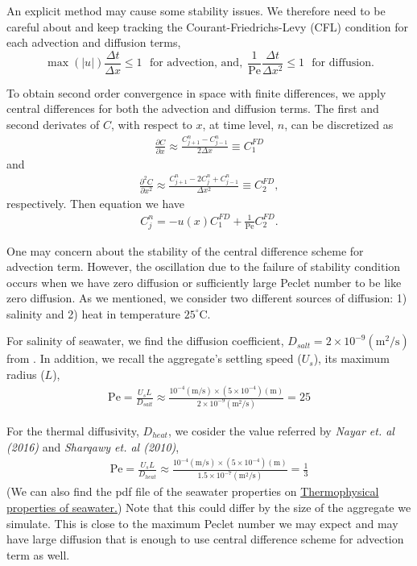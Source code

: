 An explicit method may cause some stability issues. We therefore need to be careful about and keep tracking the Courant-Friedrichs-Levy (CFL) condition for each advection and diffusion terms,
\begin{equation}
	\max(|u|) \frac{\Delta t}{\Delta x}  \leq 1 \ \ \ \text{for advection, and,}
	\ \  \frac{1}{\text{Pe}}\frac{\Delta t}{\Delta x^2}  \leq 1 \ \ \ \text{for diffusion}.
	\end{equation}
\par
To obtain second order convergence in space with finite differences, we apply  central differences for both the advection and diffusion terms. The first and second derivates of $C$, with respect to $x$, at time level, $n$, can be discretized as
\begin{align}
	\frac{\partial C}{\partial x}  \approx
	 \frac{C_{j+1}^{n} - C_{ j-1}^{n}}{2 \Delta x}
	 \equiv C_1^{FD}
	 \label{eq_c1_fd}
\end{align}
and
\begin{align}
	 \frac{\partial^2 C}{\partial x^2} \approx
	 \frac{C_{ j+1}^n -2 C_{j}^n + C_{ j-1}^n}{\Delta x^2}
	  \equiv C_2^{FD},
	 \label{eq_c2_fd}
\end{align}
respectively. 
Then equation we have
\begin{align}
	 C_{j}^n
	=  -u(x) C_1^{FD} + \frac{1}{\text{Pe}} C_2^{FD}.
\end{align}
\par
One may concern about the stability of the central difference scheme for advection term. However, the oscillation due to the failure of stability condition occurs when we have zero diffusion or sufficiently large Peclet number to be like zero diffusion. As we mentioned, we consider two different sources of diffusion: 1) salinity and 2) heat in temperature $25  ^{\circ}$C.
\par
For salinity of seawater, we find the diffusion coefficient, $D_{salt} = 2 \times 10^{-9}  (\text{m}^2\text{/s})$ from . In addition, we recall the aggregate's settling speed ($U_s$), its maximum radius ($L$),
\begin{align}
	\text{Pe} 
	= \frac{U_s L }{D_{salt}} 
	\approx \frac{10^{-4}(\text{m/s}) \times \left(5 \times 10^{-4} \right) (\text{m})}{2 \times 10^{-9} (\text{m}^2\text{/s})} = 25
\end{align}
\par 
For the thermal diffusivity, $D_{heat}$, we cosider the value referred by {\it Nayar et. al (2016)} and {\it Sharqawy et. al (2010)},
\begin{align}
	\text{Pe} 
	= \frac{U_s L }{D_{heat}} 
	\approx \frac{10^{-4}(\text{m/s}) \times \left(5 \times 10^{-4} \right) (\text{m})}{1.5 \times 10^{-7} (\text{m}^2\text{/s})} = \frac{1}{3}
\end{align}
(We can also find the pdf file of the seawater properties on \href{http://web.mit.edu/seawater/}{{\color{blue}Thermophysical properties of seawater}.})
Note that this could differ by the size of the aggregate we simulate. This is close to the maximum Peclet number we may expect and may have large diffusion that is enough to use central difference scheme for advection term as well. 